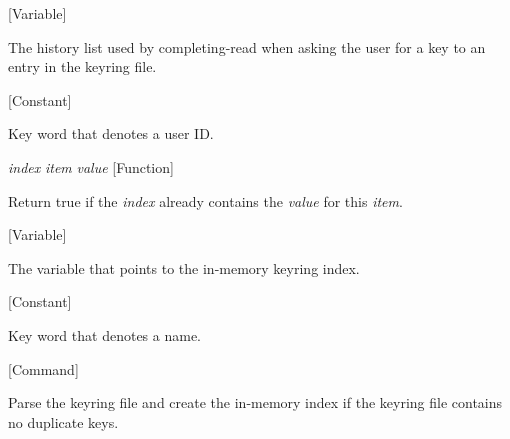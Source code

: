\vspace{1em}
\noindent
{}
\usebox{\funcname}
 \hfill [Variable]

\begin{doc-string}
The history list used by completing-read when asking the user for a key to an
entry in the keyring file.
\end{doc-string}

\vspace{1em}
\noindent
{}
\usebox{\funcname}
 \hfill [Constant]

\begin{doc-string}
Key word that denotes a user ID.
\end{doc-string}

\vspace{1em}
\noindent
{}
\usebox{\funcname}\emph{index} \emph{item} \emph{value}
 \hfill [Function]

\begin{doc-string}
Return true if the \emph{index} already contains the \emph{value} for this \emph{item}.
\end{doc-string}

\vspace{1em}
\noindent
{}
\usebox{\funcname}
 \hfill [Variable]

\begin{doc-string}
The variable that points to the in-memory keyring index.
\end{doc-string}

\vspace{1em}
\noindent
{}
\usebox{\funcname}
 \hfill [Constant]

\begin{doc-string}
Key word that denotes a name.
\end{doc-string}

\vspace{1em}
\noindent
{}
\usebox{\funcname}
 \hfill [Command]

\begin{doc-string}
Parse the keyring file and create the in-memory index if the keyring file
contains no duplicate keys.
\end{doc-string}

